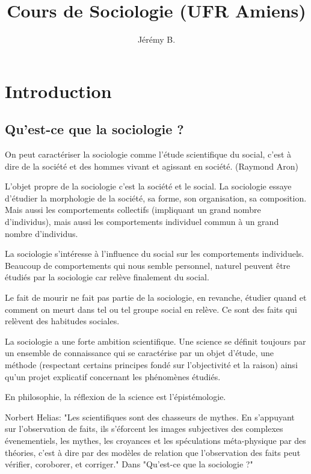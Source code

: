 \documentclass[10pt, a4paper, openany]{book}
\author{Jérémy B.}
\date{}
\title{Cours de Sociologie (UFR Amiens)}
\begin{document}
\maketitle
\tableofcontents

\chapter{Introduction}

\section{Qu'est-ce que la sociologie ?}

On peut caractériser la sociologie comme l'étude scientifique du social, c'est à dire de la société et des hommes vivant et agissant en société. (Raymond Aron) %

L'objet propre de la sociologie c'est la société et le social. La sociologie essaye d'étudier la morphologie de la société, sa forme, son organisation, sa composition. Mais aussi les comportements collectifs (impliquant un grand nombre d'individus), mais aussi les comportements individuel commun à un grand nombre d'individus.

La sociologie s'intéresse à l'influence du social sur les comportements individuels. Beaucoup de comportements qui nous semble personnel, naturel peuvent être étudiés par la sociologie car relève finalement du social.

Le fait de mourir ne fait pas partie de la sociologie, en revanche, étudier quand et comment on meurt dans tel ou tel groupe social en relève. Ce sont des faits qui relèvent des habitudes sociales. \newline

La sociologie a une forte ambition scientifique. Une science se définit toujours par un ensemble de connaissance qui se caractérise par un objet d'étude, une méthode (respectant certains principes fondé sur l'objectivité et la raison) ainsi qu'un projet explicatif concernant les phénomènes étudiés.

En philosophie, la réflexion de la science est l'épistémologie.

Norbert Helias: "Les scientifiques sont des chasseurs de mythes. En s'appuyant sur l'observation de faits, ils s'éforcent les images subjectives des complexes évenementiels, les mythes, les croyances et les spéculations méta-physique par des théories, c'est à dire par des modèles de relation que l'observation des faits peut vérifier, coroborer, et corriger." Dans "Qu'est-ce que la sociologie ?"
\end{document}
